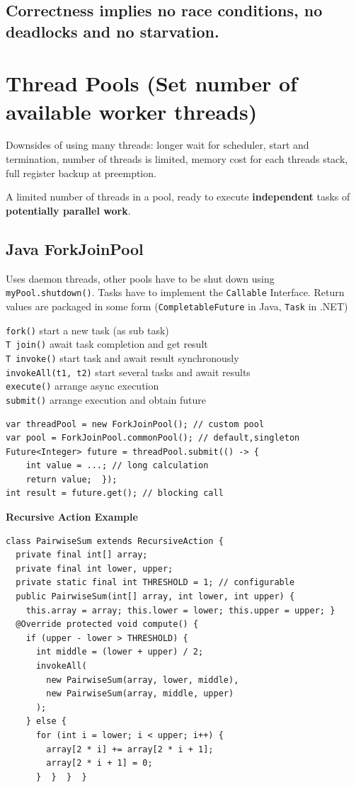 \subsection{Correctness implies no race conditions, no deadlocks and no starvation.} 

\section{Thread Pools (Set number of available worker threads)}
Downsides of using many threads: longer wait for scheduler, start and termination, number of threads is limited, memory cost for each threads stack, full register backup at preemption.

A limited number of threads in a pool, ready to execute \textbf{independent} tasks of \textbf{potentially parallel work}. 

\subsection{Java ForkJoinPool}
Uses daemon threads, other pools have to be shut down using \texttt{myPool.shutdown()}. Tasks have to implement the \texttt{Callable} Interface.
Return values are packaged in some form (\texttt{CompletableFuture} in Java, \texttt{Task} in .NET)

\texttt{fork()} start a new task (as sub task) \\
\texttt{T join()} await task completion and get result \\
\texttt{T invoke()} start task and await result synchronously \\
\texttt{invokeAll(t1, t2)} start several tasks and await results \\
\texttt{execute()} arrange async execution \\
\texttt{submit()} arrange execution and obtain future

\begin{lstlisting}[style=java]
var threadPool = new ForkJoinPool(); // custom pool
var pool = ForkJoinPool.commonPool(); // default,singleton
Future<Integer> future = threadPool.submit(() -> {
    int value = ...; // long calculation
    return value;  });
int result = future.get(); // blocking call
\end{lstlisting}
\textbf{Recursive Action Example}
\begin{lstlisting}[style=java]
class PairwiseSum extends RecursiveAction {
  private final int[] array;
  private final int lower, upper;
  private static final int THRESHOLD = 1; // configurable
  public PairwiseSum(int[] array, int lower, int upper) {
    this.array = array; this.lower = lower; this.upper = upper; }
  @Override protected void compute() {
    if (upper - lower > THRESHOLD) {
      int middle = (lower + upper) / 2;
      invokeAll(
        new PairwiseSum(array, lower, middle),
        new PairwiseSum(array, middle, upper)
      );
    } else {
      for (int i = lower; i < upper; i++) {
        array[2 * i] += array[2 * i + 1];
        array[2 * i + 1] = 0;
      }  }  }  }
\end{lstlisting}

